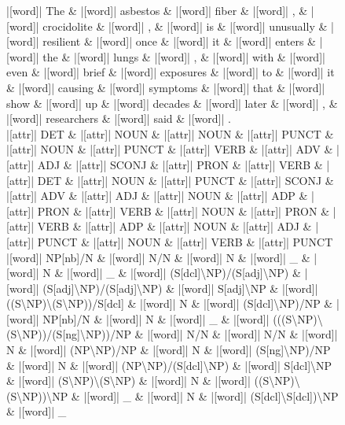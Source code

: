 \documentclass[10pt,a4paper]{article}
\begin{document}
\begin{figure}[h]
{\begin{dependency}[theme = simple]
\begin{deptext}[column sep=1em, row sep=0.1em]
|[word]| The \& |[word]| asbestos \& |[word]| fiber \& |[word]| , \& |[word]| crocidolite \& |[word]| , \& |[word]| is \& |[word]| unusually \& |[word]| resilient \& |[word]| once \& |[word]| it \& |[word]| enters \& |[word]| the \& |[word]| lungs \& |[word]| , \& |[word]| with \& |[word]| even \& |[word]| brief \& |[word]| exposures \& |[word]| to \& |[word]| it \& |[word]| causing \& |[word]| symptoms \& |[word]| that \& |[word]| show \& |[word]| up \& |[word]| decades \& |[word]| later \& |[word]| , \& |[word]| researchers \& |[word]| said \& |[word]| . \\
|[attr]| DET \& |[attr]| NOUN \& |[attr]| NOUN \& |[attr]| PUNCT \& |[attr]| NOUN \& |[attr]| PUNCT \& |[attr]| VERB \& |[attr]| ADV \& |[attr]| ADJ \& |[attr]| SCONJ \& |[attr]| PRON \& |[attr]| VERB \& |[attr]| DET \& |[attr]| NOUN \& |[attr]| PUNCT \& |[attr]| SCONJ \& |[attr]| ADV \& |[attr]| ADJ \& |[attr]| NOUN \& |[attr]| ADP \& |[attr]| PRON \& |[attr]| VERB \& |[attr]| NOUN \& |[attr]| PRON \& |[attr]| VERB \& |[attr]| ADP \& |[attr]| NOUN \& |[attr]| ADJ \& |[attr]| PUNCT \& |[attr]| NOUN \& |[attr]| VERB \& |[attr]| PUNCT \\
|[word]| NP{[}nb{]}/N \& |[word]| N/N \& |[word]| N \& |[word]| \_ \& |[word]| N \& |[word]| \_ \& |[word]| (S{[}dcl{]}\textbackslash{}NP)/(S{[}adj{]}\textbackslash{}NP) \& |[word]| (S{[}adj{]}\textbackslash{}NP)/(S{[}adj{]}\textbackslash{}NP) \& |[word]| S{[}adj{]}\textbackslash{}NP \& |[word]| ((S\textbackslash{}NP)\textbackslash{}(S\textbackslash{}NP))/S{[}dcl{]} \& |[word]| N \& |[word]| (S{[}dcl{]}\textbackslash{}NP)/NP \& |[word]| NP{[}nb{]}/N \& |[word]| N \& |[word]| \_ \& |[word]| (((S\textbackslash{}NP)\textbackslash{}(S\textbackslash{}NP))/(S{[}ng{]}\textbackslash{}NP))/NP \& |[word]| N/N \& |[word]| N/N \& |[word]| N \& |[word]| (NP\textbackslash{}NP)/NP \& |[word]| N \& |[word]| (S{[}ng{]}\textbackslash{}NP)/NP \& |[word]| N \& |[word]| (NP\textbackslash{}NP)/(S{[}dcl{]}\textbackslash{}NP) \& |[word]| S{[}dcl{]}\textbackslash{}NP \& |[word]| (S\textbackslash{}NP)\textbackslash{}(S\textbackslash{}NP) \& |[word]| N \& |[word]| ((S\textbackslash{}NP)\textbackslash{}(S\textbackslash{}NP))\textbackslash{}NP \& |[word]| \_ \& |[word]| N \& |[word]| (S{[}dcl{]}\textbackslash{}S{[}dcl{]})\textbackslash{}NP \& |[word]| \_ \\
\end{deptext}



\end{dependency}}
\end{figure}
\end{document}
